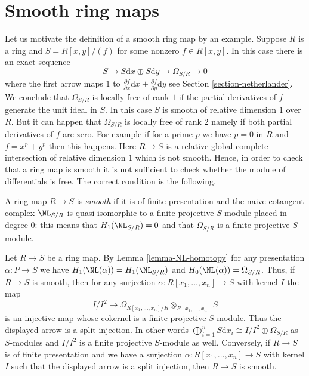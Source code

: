\section{Smooth ring maps}
\label{section-smooth}

\noindent
Let us motivate the definition of a smooth ring map by an example.
Suppose $R$ is a ring and $S = R[x, y]/(f)$ for some nonzero $f \in R[x, y]$.
In this case there is an exact sequence
$$
S \to
S\text{d}x \oplus S\text{d}y \to
\Omega_{S/R} \to 0
$$
where the first arrow maps $1$ to
$\frac{\partial f}{\partial x} \text{d}x +
\frac{\partial f}{\partial y} \text{d}y$ see
Section \ref{section-netherlander}.
We conclude that $\Omega_{S/R}$ is locally free of rank $1$ if
the partial derivatives of $f$ generate the unit ideal in $S$.
In this case $S$ is smooth of relative dimension $1$ over $R$.
But it can happen that $\Omega_{S/R}$ is locally free of rank $2$
namely if both partial derivatives of $f$ are zero. For example if
for a prime $p$ we have $p = 0$ in $R$ and $f = x^p + y^p$ then this
happens. Here $R \to S$ is a relative global complete intersection
of relative dimension $1$ which is not smooth.
Hence, in order to check that a ring map
is smooth it is not sufficient to check whether the module of differentials
is free. The correct condition is the following.

\begin{definition}
\label{definition-smooth}
A ring map $R \to S$ is {\it smooth} if it is of finite presentation
and the naive cotangent complex $\NL_{S/R}$ is quasi-isomorphic to a
finite projective $S$-module placed in degree $0$: this means
that $H_1(\NL_{S/R}) = 0$ and that $\Omega_{S/R}$ is a finite projective
$S$-module.
\end{definition}

\noindent
Let $R \to S$ be a ring map. By Lemma \ref{lemma-NL-homotopy} for any
presentation $\alpha : P \to S$ we have $H_1(\NL(\alpha)) = H_1(\NL_{S/R})$
and $H_0(\NL(\alpha)) = \Omega_{S/R}$. Thus, if $R \to S$ is smooth,
then for any surjection $\alpha : R[x_1, \ldots, x_n] \to S$ with kernel
$I$ the map
$$
I/I^2
\longrightarrow
\Omega_{R[x_1, \ldots, x_n]/R} \otimes_{R[x_1, \ldots, x_n]} S
$$
is an injective map whose cokernel is a finite projective $S$-module.
Thus the displayed arrow is a split injection. In other words
$\bigoplus_{i = 1}^n S \text{d}x_i \cong I/I^2 \oplus \Omega_{S/R}$
as $S$-modules and $I/I^2$ is a finite projective
$S$-module as well. Conversely, if $R \to S$ is of finite presentation
and we have a surjection $\alpha : R[x_1, \ldots, x_n] \to S$ with kernel
$I$ such that the displayed arrow is a split injection, then $R \to S$
is smooth.

